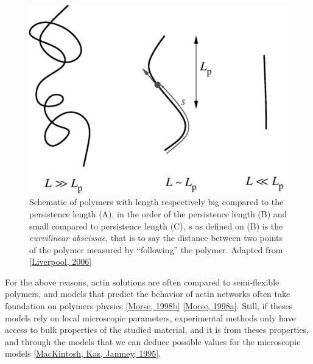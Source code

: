 \documentclass[A4paperpaper,11pt,english]{sphinxmanual}
\begin{document}
\begin{figure}[htbp]
\centering
\capstart

\includegraphics[width=0.600\linewidth]{F2_large.jpg}
\caption{Schematic of polymers with length respectively big compared to the persistence
length (A), in the order of the persistence length (B) and small compared
to persistence length (C), \(s\) as defined on (B) is the \emph{curvilinear
abscissae}, that is to say the distance between two points of the polymer
measured by ``following'' the polymer. Adapted from {\hyperref[index-latex:liverpool2006]{{[}Liverpool,  2006{]}}}}\label{index-latex:fig-persistence-length}\end{figure}

For the above reasons, actin solutions are often compared to semi-flexible
polymers, and models that predict the behavior of actin networks often take
foundation on polymers physics {\hyperref[index-latex:morse1998b]{{[}Morse,  1998b{]}}} {\hyperref[index-latex:morse1998a]{{[}Morse,  1998a{]}}}. Still, if
theses models rely on local microscopic parameters, experimental methods only
have access to bulk properties of the studied material, and it is from theses
properties, and through the models that we can deduce possible values for the
microscopic models {\hyperref[index-latex:mackintosh1995]{{[}MacKintosh, Kas, Janmey,  1995{]}}}.
\end{document}
